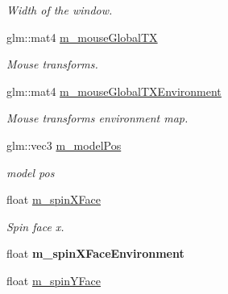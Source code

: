 \begin{DoxyCompactItemize}
\begin{DoxyCompactList}\small\item\em Width of the window. \end{DoxyCompactList}\item 
\hypertarget{class_open_g_l_widget_aceead5e683b12b021872ce51be0f9b7b}{glm\-::mat4 \hyperlink{class_open_g_l_widget_aceead5e683b12b021872ce51be0f9b7b}{m\-\_\-mouse\-Global\-T\-X}}\label{class_open_g_l_widget_aceead5e683b12b021872ce51be0f9b7b}

\begin{DoxyCompactList}\small\item\em Mouse transforms. \end{DoxyCompactList}\item 
\hypertarget{class_open_g_l_widget_a62dc8d5fd0ecb3b0d6dfaee9414a54cd}{glm\-::mat4 \hyperlink{class_open_g_l_widget_a62dc8d5fd0ecb3b0d6dfaee9414a54cd}{m\-\_\-mouse\-Global\-T\-X\-Environment}}\label{class_open_g_l_widget_a62dc8d5fd0ecb3b0d6dfaee9414a54cd}

\begin{DoxyCompactList}\small\item\em Mouse transforms environment map. \end{DoxyCompactList}\item 
\hypertarget{class_open_g_l_widget_a9b10d8acb1ae12718913821ee2b7bc33}{glm\-::vec3 \hyperlink{class_open_g_l_widget_a9b10d8acb1ae12718913821ee2b7bc33}{m\-\_\-model\-Pos}}\label{class_open_g_l_widget_a9b10d8acb1ae12718913821ee2b7bc33}

\begin{DoxyCompactList}\small\item\em model pos \end{DoxyCompactList}\item 
\hypertarget{class_open_g_l_widget_a1848ad10325dab2718baaf198f5fcb26}{float \hyperlink{class_open_g_l_widget_a1848ad10325dab2718baaf198f5fcb26}{m\-\_\-spin\-X\-Face}}\label{class_open_g_l_widget_a1848ad10325dab2718baaf198f5fcb26}

\begin{DoxyCompactList}\small\item\em Spin face x. \end{DoxyCompactList}\item 
\hypertarget{class_open_g_l_widget_a6ccace0319cdd2512c04bf3395d578f1}{float {\bfseries m\-\_\-spin\-X\-Face\-Environment}}\label{class_open_g_l_widget_a6ccace0319cdd2512c04bf3395d578f1}

\item 
\hypertarget{class_open_g_l_widget_aa55e5bc132904a919fc5016d5b6631ea}{float \hyperlink{class_open_g_l_widget_aa55e5bc132904a919fc5016d5b6631ea}{m\-\_\-spin\-Y\-Face}}\label{class_open_g_l_widget_aa55e5bc132904a919fc5016d5b6631ea}


\end{DoxyCompactItemize}
